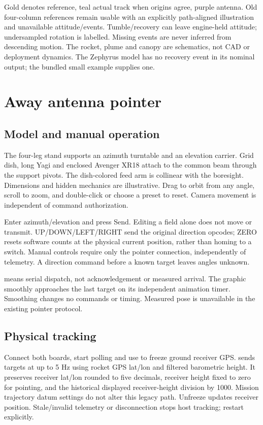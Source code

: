 Gold denotes reference, teal actual track when origins agree, purple antenna.
Old four-column references remain usable with an explicitly path-aligned
illustration and unavailable attitude/events. Tumble/recovery can leave
engine-held attitude; undersampled rotation is labelled. Missing events are
never inferred from descending motion. The rocket, plume and canopy are
schematics, not CAD or deployment dynamics. The Zephyrus model has no recovery
event in its nominal output; the bundled small example supplies one.

\section{Away antenna pointer}\label{sec:antenna}
\subsection{Model and manual operation}
The four-leg stand supports an azimuth turntable and an elevation carrier.
Grid dish, long Yagi and enclosed Avenger XR18 attach to the common beam
through the support pivots. The dish-colored feed arm is collinear with the
boresight. Dimensions and hidden mechanics are illustrative. Drag to orbit
from any angle, scroll to zoom, and double-click or choose a preset to reset.
Camera movement is independent of command authorization.


Enter azimuth/elevation and press Send. Editing a field alone does not move or
transmit. UP/DOWN/LEFT/RIGHT send the original direction opcodes; ZERO resets
software counts at the physical current position, rather than homing to a
switch. Manual controls require only the pointer connection, independently of
telemetry. A direction command before a known target leaves angles unknown.

 means serial dispatch, not acknowledgement or measured arrival.
The graphic smoothly approaches the last target on its independent animation
timer. Smoothing changes no commands or timing. Measured pose is unavailable
in the existing pointer protocol.

\subsection{Physical tracking}
Connect both boards, start polling and use  to freeze ground
receiver GPS.  sends targets at up to 5 Hz using rocket
GPS lat/lon and filtered barometric height. It preserves receiver lat/lon
rounded to five decimals, receiver height fixed to zero for pointing, and the
historical displayed receiver-height division by 1000. Mission trajectory
datum settings do not alter this legacy path. Unfreeze updates receiver position.
Stale/invalid telemetry or disconnection stops host tracking; restart explicitly.

